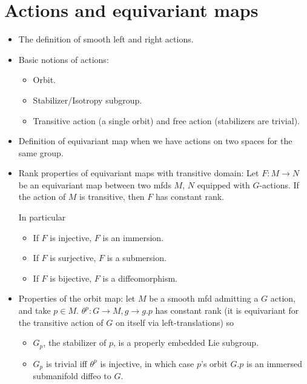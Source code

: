 \documentclass{report}
\theoremstyle{definition}
\begin{document}
\section{Actions and equivariant maps}

\begin{itemize}
    \item The definition of smooth left and right actions.
    \item Basic notions of actions:
    \begin{itemize}
        \item Orbit.
        \item Stabilizer/Isotropy subgroup.
        \item Transitive action (a single orbit) and free action (stabilizers are trivial).
    \end{itemize}
    \item Definition of equivariant map when we have actions on two spaces for the same group.

    \item Rank properties of equivariant maps with transitive domain: Let $F:M\to N$ be an equivariant map between two mfds $M$, $N$ equipped with $G$-actions. If the action of $M$ is transitive, then $F$ has constant rank.

    In particular
    \begin{itemize}
        \item If $F$ is injective, $F$ is an immersion.
        \item If $F$ is surjective, $F$ is a submersion.
        \item If $F$ is bijective, $F$ is a diffeomorphism.
    \end{itemize}

    \item Properties of the orbit map: let $M$ be a smooth mfd admitting a $G$ action, and take $p\in M$. $\theta^p:G\to M, g\to g.p$ has constant rank (it is equivariant for the transitive action of $G$ on itself via left-translations) so 
    \begin{itemize}
        \item $G_p$, the stabilizer of $p$, is a properly embedded Lie subgroup.
        \item $G_p$ is trivial iff $\theta^p$ is injective, in which case $p$'s orbit $G.p$ is an immersed submanifold diffeo to $G$.
    \end{itemize}
\end{itemize}
\end{document}
